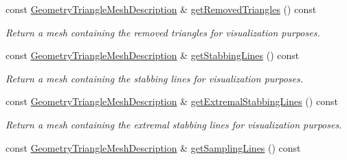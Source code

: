\begin{DoxyCompactItemize}
\item 
\mbox{\label{classvisilib_1_1_helper_visual_debugger_a46fd8688f2911538e7739acf3656b5d6}} 
const \mbox{\hyperlink{structvisilib_1_1_geometry_triangle_mesh_description}{Geometry\+Triangle\+Mesh\+Description}} \& \mbox{\hyperlink{classvisilib_1_1_helper_visual_debugger_a46fd8688f2911538e7739acf3656b5d6}{get\+Removed\+Triangles}} () const
\begin{DoxyCompactList}\small\item\em Return a mesh containing the removed triangles for visualization purposes. \end{DoxyCompactList}\item 
\mbox{\label{classvisilib_1_1_helper_visual_debugger_aa8b2f8fa4ba2b7419afe05ec35a05881}} 
const \mbox{\hyperlink{structvisilib_1_1_geometry_triangle_mesh_description}{Geometry\+Triangle\+Mesh\+Description}} \& \mbox{\hyperlink{classvisilib_1_1_helper_visual_debugger_aa8b2f8fa4ba2b7419afe05ec35a05881}{get\+Stabbing\+Lines}} () const
\begin{DoxyCompactList}\small\item\em Return a mesh containing the stabbing lines for visualization purposes. \end{DoxyCompactList}\item 
\mbox{\label{classvisilib_1_1_helper_visual_debugger_ac67b9cae7a255e07f0d7eea4e58fd516}} 
const \mbox{\hyperlink{structvisilib_1_1_geometry_triangle_mesh_description}{Geometry\+Triangle\+Mesh\+Description}} \& \mbox{\hyperlink{classvisilib_1_1_helper_visual_debugger_ac67b9cae7a255e07f0d7eea4e58fd516}{get\+Extremal\+Stabbing\+Lines}} () const
\begin{DoxyCompactList}\small\item\em Return a mesh containing the extremal stabbing lines for visualization purposes. \end{DoxyCompactList}\item 
\mbox{\label{classvisilib_1_1_helper_visual_debugger_a8b04c405e75042ba580ffc27403c178b}} 
const \mbox{\hyperlink{structvisilib_1_1_geometry_triangle_mesh_description}{Geometry\+Triangle\+Mesh\+Description}} \& \mbox{\hyperlink{classvisilib_1_1_helper_visual_debugger_a8b04c405e75042ba580ffc27403c178b}{get\+Sampling\+Lines}} () const

\end{DoxyCompactItemize}
